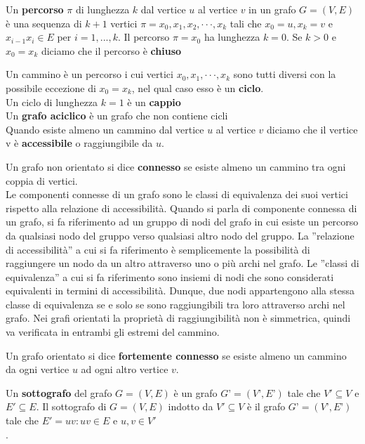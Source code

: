 \begin{definition}
Un \textbf{percorso} $\pi$ di lunghezza $k$ dal vertice $u$ al vertice $v$ in un grafo $G = (V, E)$ è
una sequenza di $k+1$ vertici $\pi= x_0, x_1, x_2,···, x_k$ tali che $x_0 = u, x_k = v$ e $x_{i-1}x_i \in E$ per $i
= 1, . . . , k$.
Il percorso $\pi = x_0$ ha lunghezza $k = 0$.
Se $k>0$ e $x_0 = x_k$ diciamo che il percorso è \textbf{chiuso}\\
\end{definition}
\begin{definition}
Un cammino è un percorso i cui vertici $x_0, x_1,···, x_k$ sono tutti diversi con la
possibile eccezione di $x_0 = x_k$, nel qual caso esso è un \textbf{ciclo}.\\
Un ciclo di lunghezza $k=1$ è un \textbf{cappio}\\
Un \textbf{grafo aciclico} è un grafo che non contiene cicli\\
Quando esiste almeno un cammino dal vertice $u$ al vertice $v$ diciamo che il vertice v è
\textbf{accessibile} o raggiungibile da $u$.\\
\end{definition}
\begin{definition}
Un grafo non orientato si dice \textbf{connesso} se esiste almeno un cammino tra ogni
coppia di vertici.\\
Le componenti connesse di un grafo sono le classi di equivalenza dei suoi vertici rispetto
alla relazione di accessibilità. Quando si parla di componente connessa di un grafo, si fa
riferimento ad un gruppo di nodi del grafo in cui esiste un percorso da qualsiasi nodo del gruppo
verso qualsiasi altro nodo del gruppo. La ”relazione di accessibilità” a cui si fa riferimento è
semplicemente la possibilità di raggiungere un nodo da un altro attraverso uno o più archi nel
grafo. Le ”classi di equivalenza” a cui si fa riferimento sono insiemi di nodi che sono considerati
equivalenti in termini di accessibilità. Dunque, due nodi appartengono alla stessa classe di
equivalenza se e solo se sono raggiungibili tra loro attraverso archi nel grafo. Nei grafi orientati
la proprietà di raggiungibilità non è simmetrica, quindi va verificata in entrambi gli estremi del
cammino.\\
\end{definition}
\begin{definition}
    Un grafo orientato si dice \textbf{fortemente connesso} se esiste almeno un cammino da ogni vertice $u$ ad ogni altro vertice $v$.\\
\end{definition}
\begin{definition}
    Un \textbf{sottografo} del grafo $G = (V, E)$ è un grafo $G’ = (V’, E’)$ tale che $V' \subseteq V$ e
$E' \subseteq E$.
Il sottografo di $G = (V, E)$ indotto da $V' \subseteq V$ è il grafo $G’ = (V’, E’)$ tale che $E'
= {uv : uv \in 
E \text{ e } u,v \in V'}$\\.
\end{definition}

